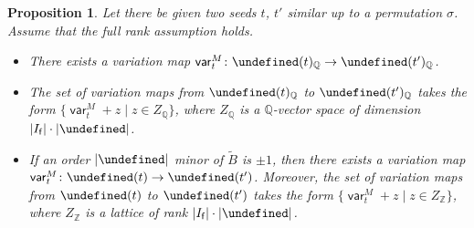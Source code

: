 \documentclass[10pt,a4paper]{amsart}
\newcommand{\Z}{\mathbb{Z}}
\newcommand{\Q}{\mathbb{Q}}
\newcommand{\opname}[1]{\operatorname{\mathsf{#1}}}
\newcommand{\tB}{{\widetilde{B}}}
\newcommand{\var}{\opname{var}}
\newcommand{\fv}{\opname{f}}
\newcommand{\ufv}{\opname{uf}}
\let\Mc\undefined
\let\Iufv\undefined
\newcommand{\Mc}{M^\circ}
\newcommand{\Iufv}{I_{\ufv}}
\numberwithin{equation}{section}
\newtheorem{Proposition}[Theorem]{Proposition}
 { \theoremstyle{definition}
\newtheorem{Definition}[Theorem]{Definition}
\newtheorem{Note}[Theorem]{Note}
\newtheorem{Example}[Theorem]{Example}
\newtheorem{Remark}[Theorem]{Remark}
\newtheorem{Assumption}[Theorem]{Assumption}
}
\begin{document}
\begin{Proposition}\label{prop:exist_linear_variation}
Let there be given two seeds $t$, $t'$ similar up to a permutation $\sigma$.
Assume that the full rank assumption holds.
\begin{itemize}\itemsep=0pt
\item[$(1)$] There exists a variation map $\var_{t}^{M}\colon\Mc(t)_{\Q}\rightarrow\Mc(t')_{\Q}$.
\item[$(2)$] The set of variation maps from $\Mc(t)_{\Q}$ to $\Mc(t')_{\Q}$
takes the form $\bigl\{\var_{t}^{M}+z\mid z\in Z_{\Q}\bigr\}$, where $Z_{\Q}$ is a $\Q$-vector space
of dimension $|I_{\fv}|\cdot|\Iufv|$.
\item[$(3)$] If an order $|\Iufv|$ minor of $\tB$ is $\pm1$, then there
exists a variation map $\var_{t}^{M}\colon\Mc(t)\rightarrow\Mc(t')$. Moreover,
the set of variation maps from $\Mc(t)$ to $\Mc(t')$ takes the form
$\bigl\{\var_{t}^{M}\allowbreak+z\mid z\in Z_{\Z}\bigr\}$, where $Z_{\Z}$ is a lattice of rank $|I_{\fv}|\cdot|\Iufv|$.
\end{itemize}
\end{Proposition}
\end{document}
